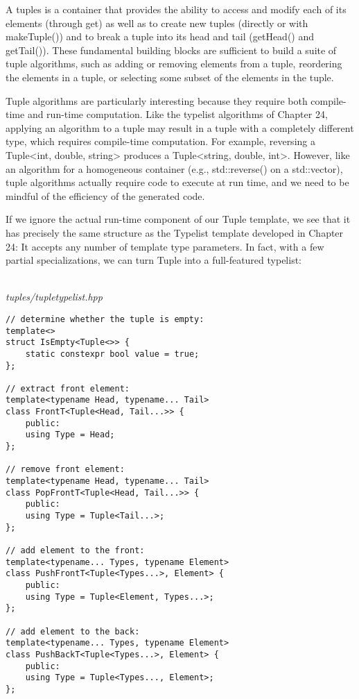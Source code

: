 
A tuples is a container that provides the ability to access and modify each of its elements (through get) as well as to create new tuples (directly or with makeTuple()) and to break a tuple into its head and tail (getHead() and getTail()). These fundamental building blocks are sufficient to build a suite of tuple algorithms, such as adding or removing elements from a tuple, reordering the elements in a tuple, or selecting some subset of the elements in the tuple.

Tuple algorithms are particularly interesting because they require both compile-time and run-time computation. Like the typelist algorithms of Chapter 24, applying an algorithm to a tuple may result in a tuple with a completely different type, which requires compile-time computation. For example, reversing a Tuple<int, double, string> produces a Tuple<string, double, int>. However, like an algorithm for a homogeneous container (e.g., std::reverse() on a std::vector), tuple algorithms actually require code to execute at run time, and we need to be mindful of the efficiency of the generated code.


If we ignore the actual run-time component of our Tuple template, we see that it has precisely the same structure as the Typelist template developed in Chapter 24: It accepts any number of template type parameters. In fact, with a few partial specializations, we can turn Tuple into a full-featured typelist:

\hspace*{\fill} \\ %
\noindent
\textit{tuples/tupletypelist.hpp}
\begin{lstlisting}[style=styleCXX]
// determine whether the tuple is empty:
template<>
struct IsEmpty<Tuple<>> {
	static constexpr bool value = true;
};

// extract front element:
template<typename Head, typename... Tail>
class FrontT<Tuple<Head, Tail...>> {
	public:
	using Type = Head;
};

// remove front element:
template<typename Head, typename... Tail>
class PopFrontT<Tuple<Head, Tail...>> {
	public:
	using Type = Tuple<Tail...>;
};

// add element to the front:
template<typename... Types, typename Element>
class PushFrontT<Tuple<Types...>, Element> {
	public:
	using Type = Tuple<Element, Types...>;
};

// add element to the back:
template<typename... Types, typename Element>
class PushBackT<Tuple<Types...>, Element> {
	public:
	using Type = Tuple<Types..., Element>;
};
\end{lstlisting}


